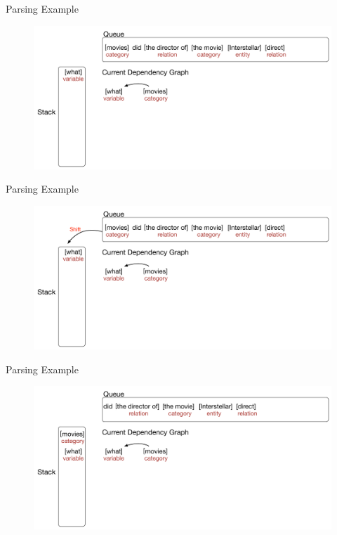 \documentclass{beamer}
\begin{document}
\begin{frame}{Parsing Example}
	\begin{figure}
		\centering\includegraphics[width=1.0\textwidth]{introduction/parsing_examples/8.pdf}
	\end{figure}	
\end{frame}

\begin{frame}{Parsing Example}
	\begin{figure}
		\centering\includegraphics[width=1.0\textwidth]{introduction/parsing_examples/9.pdf}
	\end{figure}	
\end{frame}

\begin{frame}{Parsing Example}
	\begin{figure}
		\centering\includegraphics[width=1.0\textwidth]{introduction/parsing_examples/10.pdf}
	\end{figure}	
\end{frame}
\end{document}
